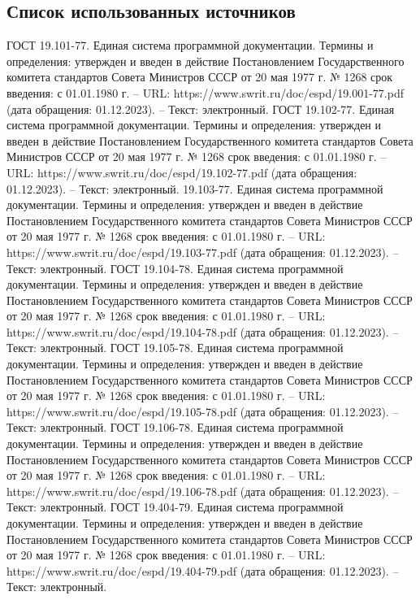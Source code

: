 \documentclass{article}
\begin{document}
\begin{itemize}
    \section{Список использованных источников}
    \begin{thebibliography}{}
         ГОСТ 19.101-77. Единая система программной документации. Термины и определения: утвержден и введен в действие Постановлением Государственного комитета стандартов Совета Министров СССР от 20 мая 1977 г. № 1268 срок введения: с 01.01.1980 г. – URL: https://www.swrit.ru/doc/espd/19.001-77.pdf (дата обращения: 01.12.2023). – Текст: электронный.
         ГОСТ 19.102-77. Единая система программной документации. Термины и определения: утвержден и введен в действие Постановлением Государственного комитета стандартов Совета Министров СССР от 20 мая 1977 г. № 1268 срок введения: с 01.01.1980 г. – URL: https://www.swrit.ru/doc/espd/19.102-77.pdf (дата обращения: 01.12.2023). – Текст: электронный.
         19.103-77. Единая система программной документации. Термины и определения: утвержден и введен в действие Постановлением Государственного комитета стандартов Совета Министров СССР от 20 мая 1977 г. № 1268 срок введения: с 01.01.1980 г. – URL: https://www.swrit.ru/doc/espd/19.103-77.pdf (дата обращения: 01.12.2023). – Текст: электронный.
         ГОСТ 19.104-78. Единая система программной документации. Термины и определения: утвержден и введен в действие Постановлением Государственного комитета стандартов Совета Министров СССР от 20 мая 1977 г. № 1268 срок введения: с 01.01.1980 г. – URL: https://www.swrit.ru/doc/espd/19.104-78.pdf (дата обращения: 01.12.2023). – Текст: электронный.
         ГОСТ 19.105-78. Единая система программной документации. Термины и определения: утвержден и введен в действие Постановлением Государственного комитета стандартов Совета Министров СССР от 20 мая 1977 г. № 1268 срок введения: с 01.01.1980 г. – URL: https://www.swrit.ru/doc/espd/19.105-78.pdf (дата обращения: 01.12.2023). – Текст: электронный.
         ГОСТ 19.106-78. Единая система программной документации. Термины и определения: утвержден и введен в действие Постановлением Государственного комитета стандартов Совета Министров СССР от 20 мая 1977 г. № 1268 срок введения: с 01.01.1980 г. – URL: https://www.swrit.ru/doc/espd/19.106-78.pdf (дата обращения: 01.12.2023). – Текст: электронный.
         ГОСТ 19.404-79. Единая система программной документации. Термины и определения: утвержден и введен в действие Постановлением Государственного комитета стандартов Совета Министров СССР от 20 мая 1977 г. № 1268 срок введения: с 01.01.1980 г. – URL: https://www.swrit.ru/doc/espd/19.404-79.pdf (дата обращения: 01.12.2023). – Текст: электронный.

\end{thebibliography}
\end{itemize}
\end{document}
